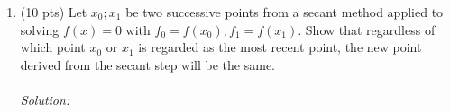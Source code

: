 \documentclass{article}
\begin{document}
\begin{enumerate}
\begin{enumerate}[label=\roman*]
			
		\end{enumerate}
		
		
		
		\item (10 pts) Let $x_0; x_1$ be two successive points from a secant method applied to solving $f(x) = 0$ with $f_0 = f(x_0); f_1 = f(x_1)$. Show that regardless of which point $x_0$ or $x_1$ is regarded as the most recent point, the new point derived from the secant step will be the same.\\
		\\
		\textit{Solution:}\\
		
		
	\end{enumerate}
	
	
	
	
	
	
\end{document}
